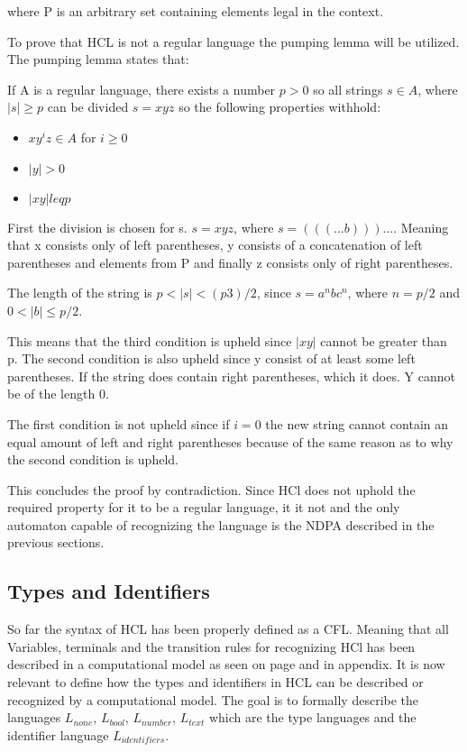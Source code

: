 where P is an arbitrary set containing elements legal in the context.

To prove that HCL is not a regular language the pumping lemma will be utilized.
The pumping lemma states that:
\begin{center}
	If A is a regular language, there exists a number $p>0$ so all strings $s \in A $, where $|s| \geq p$ can be divided $s = xyz$ so the following properties withhold:
	\begin{itemize}
		\item $xy^iz \in A$ for $i \geq 0$
		\item $|y| > 0$
		\item $|xy| leq p$
	\end{itemize}
\end{center}

First the division is chosen for s.
$s = xyz$, where $s = (((...b)))...$.
Meaning that x consists only of left parentheses, y consists of a concatenation of left parentheses and elements from P and finally z consists only of right parentheses.

The length of the string is $p < |s| < (p3)/2$, since $s = a^nbc^n$, where $n = p/2$ and $0 < |b| \leq p/2$.

This means that the third condition is upheld since $|xy|$ cannot be greater than p.
The second condition is also upheld since y consist of at least some left parentheses. 
If the string does contain right parentheses, which it does. 
Y cannot be of the length 0.

The first condition is not upheld since if $i = 0$ the new string cannot contain an equal amount of left and right parentheses because of the same reason as to why the second condition is upheld.

This concludes the proof by contradiction.
Since HCl does not uphold the required property for it to be a regular language, it it not and the only automaton capable of recognizing the language is the NDPA described in the previous sections.

\subsection{Types and Identifiers}
So far the syntax of HCL has been properly defined as a CFL. 
Meaning that all Variables, terminals and the transition rules for recognizing HCl has been described in a computational model as seen on page 
and in appendix.
It is now relevant to define how the types and identifiers in HCL can be described or recognized by a computational model.
The goal is to formally describe the languages $L_{none}$, $L_{bool}$, $L_{number}$, $L_{text}$ which are the type languages and the identifier language $L_{identifiers}$.

